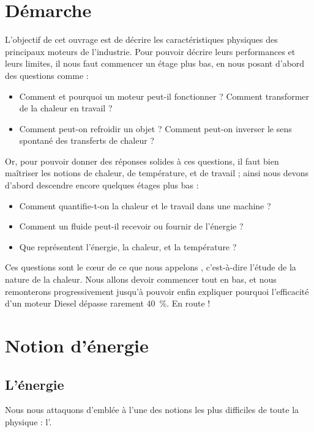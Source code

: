 \section{Démarche}

	L’objectif de cet ouvrage est de décrire les caractéristiques physiques des principaux moteurs de l’industrie. Pour pouvoir décrire leurs performances et leurs limites, il nous faut commencer un étage plus bas, en nous posant d’abord des questions comme :
	
		\begin{itemize}
			\item Comment et pourquoi un moteur peut-il fonctionner ? Comment transformer de la chaleur en travail ?
			\item Comment peut-on refroidir un objet ? Comment peut-on inverser le sens spontané des transferts de chaleur ?
		\end{itemize}

	Or, pour pouvoir donner des réponses solides à ces questions, il faut bien maîtriser les notions de chaleur, de température, et de travail ; ainsi nous devons d’abord descendre encore quelques étages plus bas :
	
		\begin{itemize}
			\item Comment quantifie-t-on la chaleur et le travail dans une machine ?
			\item Comment un fluide peut-il recevoir ou fournir de l’énergie ?
			\item Que représentent l’énergie, la chaleur, et la température ?
		\end{itemize}

	Ces questions sont le cœur de ce que nous appelons , c’est-à-dire l’étude de la nature de la chaleur. Nous allons devoir commencer tout en bas, et nous remonterons progressivement jusqu’à pouvoir enfin expliquer pourquoi l’efficacité d’un moteur Diesel dépasse rarement \SI{40}{\percent}. En route !
	
\section{Notion d’énergie}

	\subsection{L’énergie}
	\label{ch_energie}
	
		Nous nous attaquons d’emblée à l’une des notions les plus difficiles de toute la physique : l’.
		
